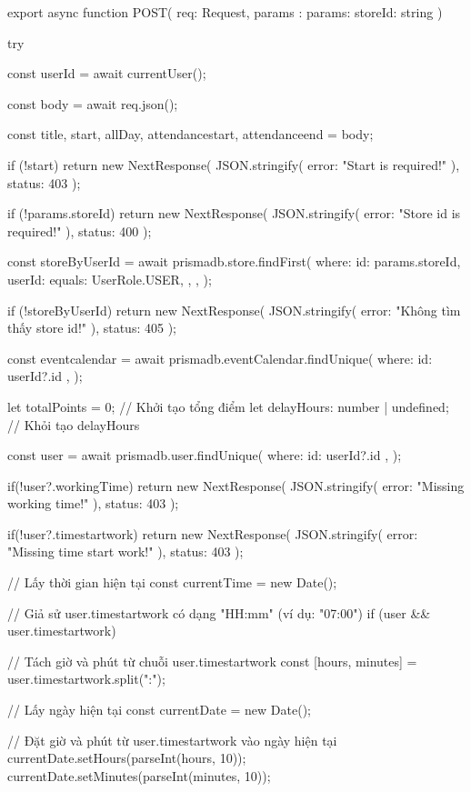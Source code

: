 export async function POST(
  req: Request,
  { params }: { params: { storeId: string } }
) {
  try {
    const userId = await currentUser();

    const body = await req.json();

    const { title, start, allDay, attendancestart, attendanceend } = body;

    if (!start) {
      return new NextResponse(
        JSON.stringify({ error: "Start is required!" }),
        { status: 403 }
      );
    }

    if (!params.storeId) {
      return new NextResponse(
        JSON.stringify({ error: "Store id is required!" }),
        { status: 400 }
      );
    }

    const storeByUserId = await prismadb.store.findFirst({
      where: {
        id: params.storeId,
        userId: {
          equals: UserRole.USER,
        },
      },
    });

    if (!storeByUserId) {
      return new NextResponse(
        JSON.stringify({ error: "Không tìm thấy store id!" }),
        { status: 405 }
      );
    }

    const eventcalendar = await prismadb.eventCalendar.findUnique({
      where: { id: userId?.id },
    });

    let totalPoints = 0; // Khởi tạo tổng điểm
    let delayHours: number | undefined; // Khỏi tạo delayHours

    const user = await prismadb.user.findUnique({
      where: { id: userId?.id },
    });

    if(!user?.workingTime){
      return new NextResponse(
        JSON.stringify({ error: "Missing working time!" }),
        { status: 403 }
      );
    }

    if(!user?.timestartwork){
      return new NextResponse(
        JSON.stringify({ error: "Missing time start work!" }),
        { status: 403 }
      );
    }

    // Lấy thời gian hiện tại
    const currentTime = new Date();

    // Giả sử user.timestartwork có dạng "HH:mm" (ví dụ: "07:00")
    if (user && user.timestartwork) {
      // Tách giờ và phút từ chuỗi user.timestartwork
      const [hours, minutes] = user.timestartwork.split(":");

      // Lấy ngày hiện tại
      const currentDate = new Date();

      // Đặt giờ và phút từ user.timestartwork vào ngày hiện tại
      currentDate.setHours(parseInt(hours, 10));
      currentDate.setMinutes(parseInt(minutes, 10));

}}}
